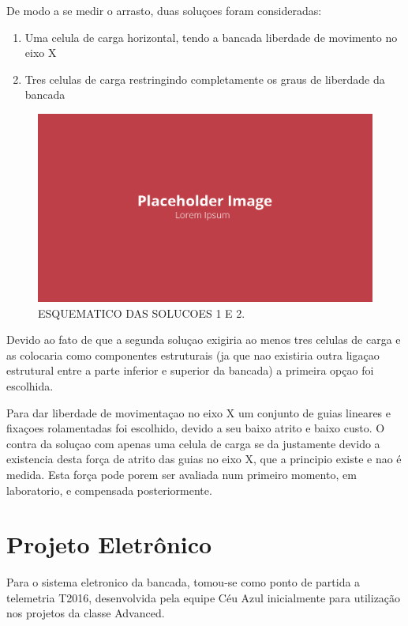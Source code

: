 De modo a se medir o arrasto, duas soluçoes foram consideradas: 

\begin{enumerate}
    \item Uma celula de carga horizontal, tendo a bancada liberdade de movimento no eixo X
    \item Tres celulas de carga restringindo completamente os graus de liberdade da bancada
\end{enumerate}

\begin{figure}[!ht]
    \centering
    \includegraphics[width=.8\linewidth]{figuras/placeholder.png}
    \caption{ESQUEMATICO DAS SOLUCOES 1 E 2\cite{autor}.}
    \label{fig:placeholder}
\end{figure}

Devido ao fato de que a segunda soluçao exigiria ao menos tres celulas de carga e as colocaria como componentes estruturais (ja que nao existiria outra ligaçao estrutural entre a parte inferior e superior da bancada) a primeira opçao foi escolhida.

Para dar liberdade de movimentaçao no eixo X um conjunto de guias lineares e fixaçoes rolamentadas foi escolhido, devido a seu baixo atrito e baixo custo. O contra da soluçao com apenas uma celula de carga se da justamente devido a existencia desta força de atrito das guias no eixo X, que a principio existe e nao é medida. Esta força pode porem ser avaliada num primeiro momento, em laboratorio, e compensada posteriormente.
    
\section{Projeto Eletrônico}

Para o sistema eletronico da bancada, tomou-se como ponto de partida a telemetria T2016, desenvolvida pela equipe Céu Azul inicialmente para utilização nos projetos da classe Advanced.

